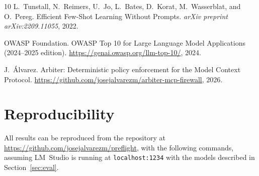 \documentclass[11pt,a4paper]{article}
\begin{document}
\begin{thebibliography}{10}
L.~Tunstall, N.~Reimers, U.~Jo, L.~Bates, D.~Korat, M.~Wasserblat,
  and O.~Pereg.
\newblock Efficient Few-Shot Learning Without Prompts.
\newblock \emph{arXiv preprint arXiv:2209.11055}, 2022.

{OWASP Foundation}.
\newblock OWASP Top 10 for Large Language Model Applications (2024--2025 edition).
\newblock \url{https://genai.owasp.org/llm-top-10/}, 2024.

J.~\'Alvarez.
\newblock Arbiter: Deterministic policy enforcement for the Model Context
  Protocol.
\newblock \url{https://github.com/josejalvarezm/arbiter-mcp-firewall}, 2026.

\end{thebibliography}

\appendix

\section{Reproducibility}
\label{app:reproduce}

All results can be reproduced from the repository at
\url{https://github.com/josejalvarezm/preflight},
with the following commands, assuming
LM~Studio is running at \texttt{localhost:1234} with the models described
in Section~\ref{sec:eval}.
\end{document}
